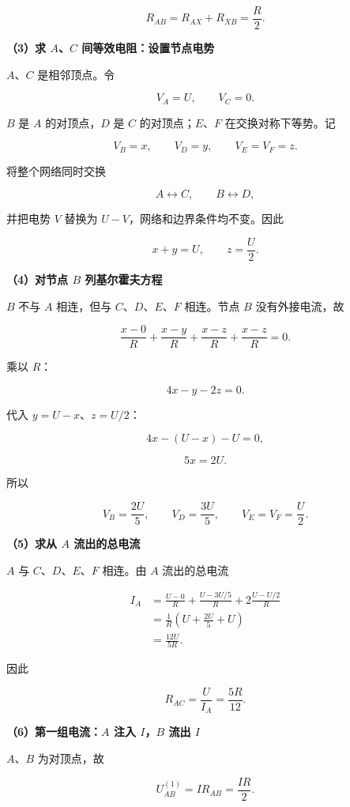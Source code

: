 \documentclass[12pt,a4paper,UTF8]{ctexart}
\begin{document}
\[
\boxed{
R_{AB}=R_{AX}+R_{XB}=\frac R2
}.
\tag{3}
\]

\textbf{（3）求 \(A\)、\(C\) 间等效电阻：设置节点电势}

\(A\)、\(C\) 是相邻顶点。令

\[
V_A=U,\qquad V_C=0.
\tag{4}
\]

\(B\) 是 \(A\) 的对顶点，\(D\) 是 \(C\) 的对顶点；\(E\)、\(F\)
在交换对称下等势。记

\[
V_B=x,\qquad V_D=y,\qquad V_E=V_F=z.
\tag{5}
\]

将整个网络同时交换

\[
A\leftrightarrow C,\qquad B\leftrightarrow D,
\]

并把电势 \(V\) 替换为 \(U-V\)，网络和边界条件均不变。因此

\[
x+y=U,
\qquad
z=\frac U2.
\tag{6}
\]

\textbf{（4）对节点 \(B\) 列基尔霍夫方程}

\(B\) 不与 \(A\) 相连，但与 \(C\)、\(D\)、\(E\)、\(F\) 相连。节点 \(B\)
没有外接电流，故

\[
\frac{x-0}{R}
+\frac{x-y}{R}
+\frac{x-z}{R}
+\frac{x-z}{R}=0.
\]

乘以 \(R\)：

\[
4x-y-2z=0.
\tag{7}
\]

代入 \(y=U-x\)、\(z=U/2\)：

\[
4x-(U-x)-U=0,
\]

\[
5x=2U.
\]

所以

\[
\boxed{
V_B=\frac{2U}{5},
\qquad
V_D=\frac{3U}{5},
\qquad
V_E=V_F=\frac U2
}.
\tag{8}
\]

\textbf{（5）求从 \(A\) 流出的总电流}

\(A\) 与 \(C\)、\(D\)、\(E\)、\(F\) 相连。由 \(A\) 流出的总电流

\[
\begin{aligned}
I_A
&=\frac{U-0}{R}
+\frac{U-3U/5}{R}
+2\frac{U-U/2}{R}\\
&=\frac1R
\left(
U+\frac{2U}{5}+U
\right)\\
&=\frac{12U}{5R}.
\end{aligned}
\tag{9}
\]

因此

\[
\boxed{
R_{AC}=\frac{U}{I_A}=\frac{5R}{12}
}.
\tag{10}
\]

\textbf{（6）第一组电流：\(A\) 注入 \(I\)，\(B\) 流出 \(I\)}

\(A\)、\(B\) 为对顶点，故

\[
U_{AB}^{(1)}=IR_{AB}=\frac{IR}{2}.
\tag{11}
\]
\end{document}

